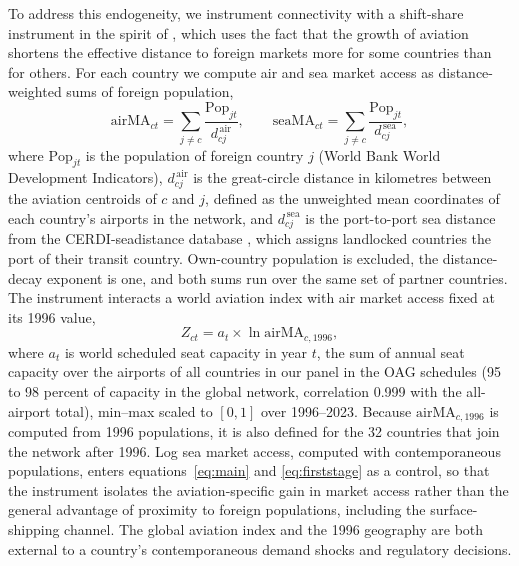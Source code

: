 To address this endogeneity, we instrument connectivity with a shift-share instrument in the spirit of \citet{feyrer2019}, which uses the fact that the growth of aviation shortens the effective distance to foreign markets more for some countries than for others. For each country we compute air and sea market access as distance-weighted sums of foreign population,
\begin{equation}
\mathrm{airMA}_{ct}=\sum_{j\neq c}\frac{\mathrm{Pop}_{jt}}{d^{\,\mathrm{air}}_{cj}},
\qquad
\mathrm{seaMA}_{ct}=\sum_{j\neq c}\frac{\mathrm{Pop}_{jt}}{d^{\,\mathrm{sea}}_{cj}},
\label{eq:seama}
\end{equation}
where $\mathrm{Pop}_{jt}$ is the population of foreign country $j$ (World Bank World Development Indicators), $d^{\,\mathrm{air}}_{cj}$ is the great-circle distance in kilometres between the aviation centroids of $c$ and $j$, defined as the unweighted mean coordinates of each country's airports in the network, and $d^{\,\mathrm{sea}}_{cj}$ is the port-to-port sea distance from the CERDI-seadistance database \citep{bertoli2016}, which assigns landlocked countries the port of their transit country. Own-country population is excluded, the distance-decay exponent is one, and both sums run over the same set of partner countries. The instrument interacts a world aviation index with air market access fixed at its 1996 value,
\begin{equation}
Z_{ct}=a_t\times\ln \mathrm{airMA}_{c,1996},
\label{eq:feyrer}
\end{equation}
where $a_t$ is world scheduled seat capacity in year $t$, the sum of annual seat capacity over the airports of all countries in our panel in the OAG schedules (95 to 98 percent of capacity in the global network, correlation 0.999 with the all-airport total), min--max scaled to $[0,1]$ over 1996--2023. Because $\mathrm{airMA}_{c,1996}$ is computed from 1996 populations, it is also defined for the 32 countries that join the network after 1996. Log sea market access, computed with contemporaneous populations, enters equations~\ref{eq:main} and \ref{eq:firststage} as a control, so that the instrument isolates the aviation-specific gain in market access rather than the general advantage of proximity to foreign populations, including the surface-shipping channel. The global aviation index and the 1996 geography are both external to a country's contemporaneous demand shocks and regulatory decisions.

